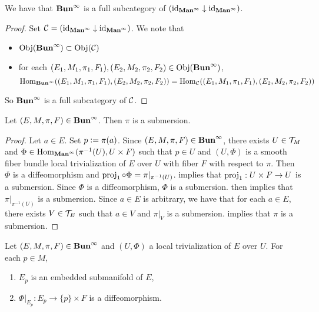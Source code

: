 \documentclass{book}
\begin{document}
	\begin{ex} 
		We have that $\operatorname*{\text{\textbf{Bun}}^{\infty}}$ is a full subcategory of $(\operatorname{id}_{\operatorname*{\text{\textbf{Man}}^{\infty}}} \downarrow \operatorname{id}_{\operatorname*{\text{\textbf{Man}}^{\infty}}})$.
	\end{ex}
	
	\begin{proof} Set $\mathcal{C} = (\operatorname{id}_{\operatorname*{\text{\textbf{Man}}^{\infty}}} \downarrow \operatorname{id}_{\operatorname*{\text{\textbf{Man}}^{\infty}}})$. We note that 
		\begin{itemize}
			\item $\operatorname{Obj}(\operatorname*{\text{\textbf{Bun}}^{\infty}}) \subset \operatorname{Obj}(\mathcal{C})$
			\item for each $(E_1, M_1, \pi_1, F_1), (E_2, M_2, \pi_2, F_2) \in \operatorname{Obj}(\operatorname*{\text{\textbf{Bun}}^{\infty}})$, 
			$$\operatorname{Hom}_{\operatorname*{\text{\textbf{Bun}}^{\infty}}}((E_1, M_1, \pi_1, F_1), (E_2, M_2, \pi_2, F_2)) = \operatorname{Hom}_{\mathcal{C}}((E_1, M_1, \pi_1, F_1), (E_2, M_2, \pi_2, F_2))$$
		\end{itemize}
		So $\operatorname*{\text{\textbf{Bun}}^{\infty}}$ is a full subcategory of $\mathcal{C}$.
	\end{proof}

	\begin{ex}
		Let $(E, M, \pi, F) \in \operatorname*{\text{\textbf{Bun}}^{\infty}}$. Then $\pi$ is a submersion.
	\end{ex}

	\begin{proof}
		Let $a \in E$. Set $p \vcentcolon= \pi(a)$. Since $(E, M, \pi, F) \in \operatorname*{\text{\textbf{Bun}}^{\infty}}$, there exists $U \in \mathcal{T}_M$ and $\Phi \in \operatorname{Hom}_{\operatorname*{\text{\textbf{Man}}^{\infty}}}(\pi^{-1}(U), U \times F)$ such that $p \in U$ and $(U, \Phi)$ is a smooth fiber bundle local trivialization of $E$ over $U$ with fiber $F$ with respect to $\pi$. Then $\Phi$ is a diffeomorphism and $\operatorname{\text{proj}}_1 \circ \Phi = \pi|_{\pi^{-1}(U)}$.  implies that $\operatorname{\text{proj}}_1: U \times F \rightarrow U$ is a submersion. Since $\Phi$ is a diffeomorphism, $\Phi$ is a submersion.  then implies that $\pi|_{\pi^{-1}(U)}$ is a submersion. Since $a \in E$ is arbitrary, we have that for each $a \in E$, there exists $V \in \mathcal{T}_E$ such that $a \in V$ and $\pi|_V$ is a submersion.   implies that $\pi$ is a submersion.
	\end{proof}

	\begin{ex} 
		Let $(E, M, \pi, F) \in \operatorname*{\text{\textbf{Bun}}^{\infty}}$ and $(U, \Phi)$ a local trivialization of $E$ over $U$. For each $p \in M$,
		\begin{enumerate}
			\item $E_p$ is an embedded submanifold of $E$,
			\item $\Phi|_{E_p}: E_p \rightarrow \{p\} \times F$ is a diffeomorphism.
		\end{enumerate}
	\end{ex}
\end{document}
